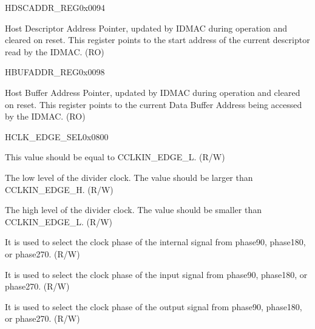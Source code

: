 \begin{register}{H}{DSCADDR\_REG}{0x0094}\label{regdesc:DSCADDRREG}
%
\regnewline%
\begin{regdesc}\begin{reglist}
\item [DSCADDR\_REG]Host Descriptor Address Pointer, updated by IDMAC during operation and cleared on reset. This register points to the start address of the current descriptor read by the IDMAC. (RO)
\end{reglist}\end{regdesc}
\end{register}


\begin{register}{H}{BUFADDR\_REG}{0x0098}\label{regdesc:BUFADDRREG}
%
\regnewline%
\begin{regdesc}\begin{reglist}
\item [BUFADDR\_REG]Host Buffer Address Pointer, updated by IDMAC during operation and cleared on reset. This register points to the current Data Buffer Address being accessed by the IDMAC. (RO)
\end{reglist}\end{regdesc}
\end{register}

\begin{register}{H}{CLK\_EDGE\_SEL}{0x0800}\label{regdesc:CLKEDGESEL}
%
%
%
%
%
%
%
\regnewline%
\begin{regdesc}\begin{reglist}
\item[CCLKIN\_EDGE\_N] This value should be equal to CCLKIN\_EDGE\_L. (R/W)
\item[CCLKIN\_EDGE\_L]The low level of the divider clock. The value should be larger than CCLKIN\_EDGE\_H. (R/W)
\item[CCLKIN\_EDGE\_H]The high level of the divider clock. The value should be smaller than CCLKIN\_EDGE\_L. (R/W)
\item[CCLKIN\_EDGE\_SLF\_SEL]It is used to select the clock phase of the internal signal from phase90, phase180, or phase270. (R/W)
\item[CCLKIN\_EDGE\_SAM\_SEL]It is used to select the clock phase of the input signal from phase90, phase180, or phase270. (R/W)
\item[CCLKIN\_EDGE\_DRV\_SEL]It is used to select the clock phase of the output signal from phase90, phase180, or phase270. (R/W)\\
\end{reglist}\end{regdesc}

\end{register}



